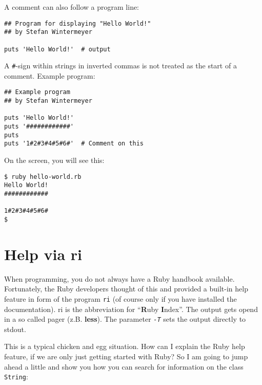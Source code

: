 \documentclass[a4paper]{book}
\begin{document}
A comment can also follow a program line:

\begin{shaded}\begin{verbatim}
## Program for displaying "Hello World!"
## by Stefan Wintermeyer

puts 'Hello World!'  # output
\end{verbatim}\end{shaded}

A \texttt{\#}-sign within strings in inverted commas is not treated as the start of a comment. Example program:

\begin{shaded}\begin{verbatim}
## Example program
## by Stefan Wintermeyer

puts 'Hello World!'
puts '############'
puts
puts '1#2#3#4#5#6#'  # Comment on this
\end{verbatim}\end{shaded}

On the screen, you will see this:

\begin{shaded}\begin{verbatim}
$ ruby hello-world.rb
Hello World!
############

1#2#3#4#5#6#
$
\end{verbatim}\end{shaded}

\section{Help via ri}\label{help-via-ri}

When programming, you do not always have a Ruby handbook available. Fortunately, the Ruby developers thought of this and provided a built-in help feature in form of the program \texttt{ri} (of course only if you have installed the documentation). ri is the abbreviation for “\textbf{R}uby \textbf{I}ndex”. The output gets opend in a so called pager (z.B. \textbf{less}). The parameter \emph{\texttt{-T}} sets the output directly to stdout.

This is a typical chicken and egg situation. How can I explain the Ruby help feature, if we are only just getting started with Ruby? So I am going to jump ahead a little and show you how you can search for information on the class \texttt{String}:
\end{document}

